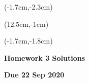 \documentclass[12pt, oneside]{article}
\begin{document}
\begin{textblock*}{4cm}(-1.7cm,-2.3cm)
\end{textblock*}

\begin{textblock*}{8cm}(12.5cm,-1cm)
\end{textblock*}
\begin{textblock*}{13.5cm}(-1.7cm,-1.8cm)
\end{textblock*}

\vspace{1cm}

\begin{center}
\textbf{\Large Homework 3 Solutions}

\textbf{Due 22 Sep 2020}
\end{center}
\end{document}
